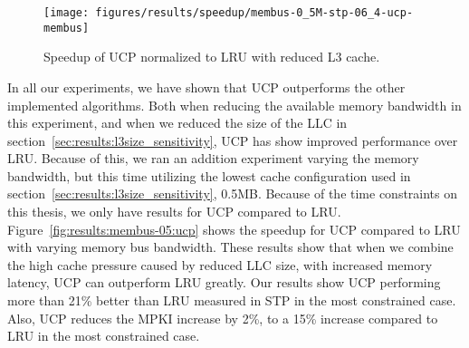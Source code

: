 \begin{figure}[t]
    \centering
        \texttt{[image: figures/results/speedup/membus-0\_5M-stp-06\_4-ucp-membus]}
        \caption{Speedup of UCP normalized to LRU with reduced L3 cache.}
        \label{fig:results:bus-05:ucp}
\end{figure}


In all our experiments, we have shown that UCP outperforms the other implemented algorithms.
Both when reducing the available memory bandwidth in this experiment, and when we reduced the size of the LLC in section~\ref{sec:results:l3size_sensitivity}, UCP has show improved performance over LRU.
Because of this, we ran an addition experiment varying the memory bandwidth, but this time utilizing the lowest cache configuration used in section~\ref{sec:results:l3size_sensitivity}, 0.5MB.
Because of the time constraints on this thesis, we only have results for UCP compared to LRU.
Figure~\ref{fig:results:membus-05:ucp} shows the speedup for UCP compared to LRU with varying memory bus bandwidth.
These results show that when we combine the high cache pressure caused by reduced LLC size, with increased memory latency, UCP can outperform LRU greatly.
Our results show UCP performing more than 21\% better than LRU measured in STP in the most constrained case.
Also, UCP reduces the MPKI increase by 2\%, to a 15\% increase compared to LRU in the most constrained case.
